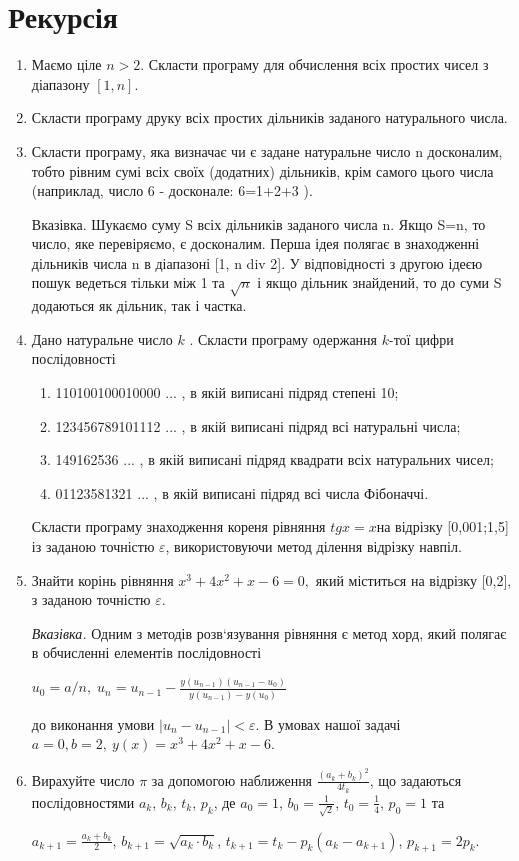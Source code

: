 \documentclass[]{article}
\makeatletter
\newcommand{\xslalph}[1]{\expandafter\@xslalph\csname c@#1\endcsname}
\newcommand{\@xslalph}[1]{%
    \ifcase#1\or а\or б\or в\or г\or д\or e\or є\or ж\or з\or i%
    \or й\or к\or л\or м\or н\or о\or п\or р\or с\or т%
    \or у\or ф\or х\or ц\or ч\or ш\or ю\or я\or аа\or бб\or вв %
    \else\@ctrerr\fi%
}
\makeatother
\begin{document}
\section{Рекурсія}
\begin{enumerate}
\item
Маємо ціле \(n > 2\). Скласти програму для обчислення всіх простих чисел
з діапазону \(\left\lbrack 1,n \right\rbrack.\)
\item
Скласти програму друку всіх простих дільників заданого натурального
числа.
\item
Скласти програму, яка визначає чи є задане натуральне число n
досконалим, тобто рівним сумі всіх своїх (додатних) дільників, крім
самого цього числа (наприклад, число 6 - досконале: 6=1+2+3 ).

Вказівка. Шукаємо суму S всіх дільників заданого числа n. Якщо S=n, то
число, яке перевіряємо, є досконалим. Перша ідея полягає в знаходженні
дільників числа n в діапазоні {[}1, n div 2{]}. У відповідності з другою
ідеєю пошук ведеться тільки між 1 та \(\sqrt{n}\) і якщо дільник
знайдений, то до суми S додаються як дільник, так і частка.

\item
  Дано натуральне число $k$ . Скласти програму одержання $k$-тої цифри послідовності
\begin{enumerate}[label=\xslalph*)]
\item 110100100010000 ... , в якій виписані підряд степені 10;
\item 123456789101112 ... , в якій виписані підряд всі натуральні числа;
\item 149162536 ... , в якій виписані підряд квадрати всіх натуральних
чисел;
\item 01123581321 ... , в якій виписані підряд всі числа Фібоначчі.

\end{enumerate}
Скласти програму знаходження кореня рівняння \(tgx = x\)на відрізку
{[}0,001;1,5{]} із заданою точністю \(\varepsilon\), використовуючи
метод ділення відрізку навпіл.
\item
  Знайти корінь рівняння \(x^{3} + 4x^{2} + x - 6 = 0,\) який міститься
  на відрізку {[}0,2{]}, з заданою точністю \(\varepsilon\).

\emph{\emph{Вказівка.}} Одним з методів розв`язування рівняння є метод
хорд, який полягає в обчисленні елементів послідовності 

\(u_{0} = a / n, \;  u_{n} = u_{n-1} - \frac{y(u_{n-1}) (u_{n-1} -u_{0})}{y(u_{n-1}) -y(u_{0})} \) 

до виконання умови \(\left| u_{n} - u_{n - 1} \right| < \varepsilon\). В
умовах нашої задачі \(a = 0,b = 2,\ y(x) = x^{3} + 4x^{2} + x - 6.\)


\item
Вирахуйте число $\pi$ за допомогою наближення $\frac{(a_{k} + b_{k})^{2}}{4t_{k}}$,
що задаються послідовностями $a_k$, $b_k$, $t_k$, $p_k$, де
$a_0 = 1$, $b_0 = \frac{1}{\sqrt{2}}$, $t_0 = \frac{1}{4}$, $p_0 = 1$ та

$a_{k+1} = \frac{a_{k} + b_{k}}{2}$, $b_{k+1} = \sqrt{a_{k}\cdot b_{k}}$, 
$t_{k+1} = t_{k} - p_{k}(a_{k}-a_{k+1})$, $p_{k+1} =2p_{k}$.

\end{enumerate}
\end{document}
